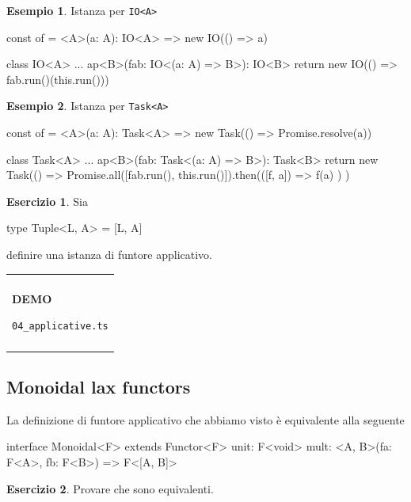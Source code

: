 \documentclass[12pt]{article}
\theoremstyle{definition}
\newtheorem{example}{Esempio}[section]
\newtheorem{exercise}{Esercizio}[section]
\newenvironment{demo}
    {\begin{center}
    \begin{tabular}{|p{0.9\textwidth}|}
    \hline\\
    }
    {
    \\\\\hline
    \end{tabular}
    \end{center}
    }
\newenvironment{code}
  {\vspace{0.5cm} \VerbatimEnvironment\begin{typescriptcode}}
  {\end{typescriptcode} \vspace{0.2cm}}
\begin{document}
\begin{example}
Istanza per \texttt{IO<A>}

\begin{code}
const of = <A>(a: A): IO<A> => new IO(() => a)

class IO<A> {
  ...
  ap<B>(fab: IO<(a: A) => B>): IO<B> {
    return new IO(() => fab.run()(this.run()))
  }
}
\end{code}
\end{example}

\begin{example}
Istanza per \texttt{Task<A>}

\begin{code}
const of = <A>(a: A): Task<A> =>
  new Task(() => Promise.resolve(a))

class Task<A> {
  ...
  ap<B>(fab: Task<(a: A) => B>): Task<B> {
    return new Task(() =>
      Promise.all([fab.run(), this.run()]).then(([f, a]) =>
        f(a)
      )
    )
  }
}
\end{code}
\end{example}

\begin{exercise}
Sia

\begin{code}
type Tuple<L, A> = [L, A]
\end{code}

definire una istanza di funtore applicativo.
\end{exercise}

\begin{demo}
\begin{center}
\textbf{DEMO}

\texttt{04\_applicative.ts}
\end{center}
\end{demo}

\subsection{Monoidal lax functors}

La definizione di funtore applicativo che abbiamo visto è equivalente alla seguente

\begin{code}
interface Monoidal<F> extends Functor<F> {
  unit: F<void>
  mult: <A, B>(fa: F<A>, fb: F<B>) => F<[A, B]>
}
\end{code}

\begin{exercise}
Provare che sono equivalenti.
\end{exercise}
\end{document}
